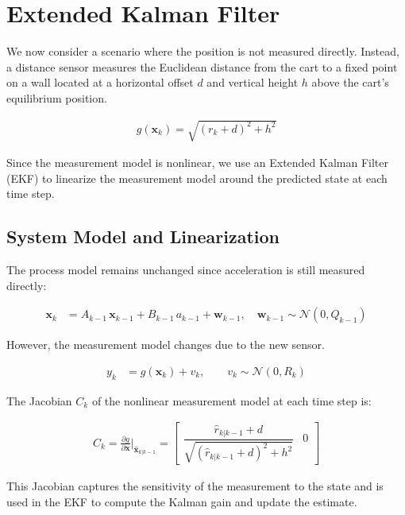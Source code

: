 \section{Extended Kalman Filter}

We now consider a scenario where the position is not measured directly. Instead, a distance sensor measures the Euclidean distance from the cart to a fixed point on a wall located at a horizontal offset \( d \) and vertical height \( h \) above the cart's equilibrium position. 

\begin{align}
    g(\mathbf{x}_k) = \sqrt{(r_k + d)^2 + h^2}
\end{align}

Since the measurement model is nonlinear, we use an Extended Kalman Filter (EKF) to linearize the measurement model around the predicted state at each time step.

\clearpage

\subsection{System Model and Linearization}

The process model remains unchanged since acceleration is still measured directly:

\begin{align}
    \mathbf{x}_k &= A_{k-1} \, \mathbf{x}_{k-1} + B_{k-1} \, a_{k-1} + \mathbf{w}_{k-1}, \quad \mathbf{w}_{k-1} \sim \mathcal{N}(0, Q_{k-1})
\end{align}

However, the measurement model changes due to the new sensor. 

\begin{align}
    y_k &= g(\mathbf{x}_k) + v_k, \quad\quad
    v_k \sim \mathcal{N}(0, R_k) 
\end{align}

The Jacobian \( C_k \) of the nonlinear measurement model at each time step is:


\begin{align}
    C_k = \frac{\partial g}{\partial \mathbf{x}} |_{\hat{\mathbf{x}}_{k|k-1}} =
    \begin{bmatrix}
        \dfrac{\hat{r}_{k|k-1} + d}{\sqrt{(\hat{r}_{k|k-1} + d)^2 + h^2}} & 0
    \end{bmatrix}
\end{align}

This Jacobian captures the sensitivity of the measurement to the state and is used in the EKF to compute the Kalman gain and update the estimate.

